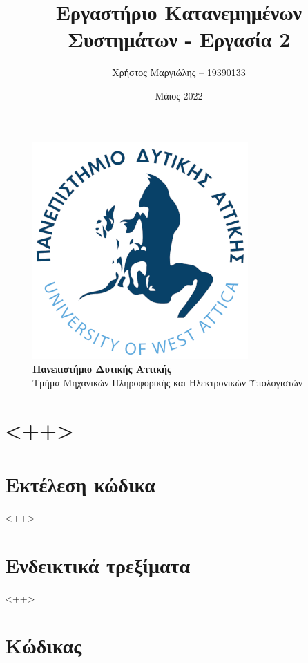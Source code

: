 \documentclass{article}
\title{Εργαστήριο Κατανεμημένων Συστημάτων - Εργασία 2}
\author{Χρήστος Μαργιώλης -- 19390133}
\date{Μάιος 2022}
\begin{document}
\begin{titlepage}
        \maketitle
        \begin{figure}[t!]
        \begin{center}
        \includegraphics[scale=0.3]{./res/uniwalogo.png} \\
        \Large
        \textbf{Πανεπιστήμιο Δυτικής Αττικής} \\
        \large
        Τμήμα Μηχανικών Πληροφορικής και Ηλεκτρονικών Υπολογιστών
        \end{center}
        \end{figure}
\end{titlepage}

\renewcommand{\contentsname}{Περιεχόμενα}
\tableofcontents

\section{<++>}

\section{Εκτέλεση κώδικα}

<++>

\section{Ενδεικτικά τρεξίματα}

<++>

\section{Κώδικας}
\end{document}
